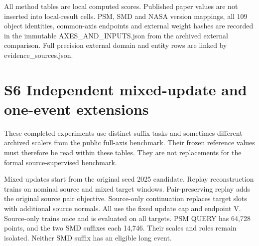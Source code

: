 \documentclass[
  english,
  9pt,
]{article}
\begin{document}
All method tables are local computed scores. Published paper values are
not inserted into local-result cells. PSM, SMD and NASA version
mappings, all 109 object identities, common-axis endpoints and external
weight hashes are recorded in the immutable AXES\_AND\_INPUTS.json from
the archived external comparison. Full precision external domain and
entity rows are linked by evidence\_sources.json.

\section{S6 Independent mixed-update and one-event
extensions}\label{s6-independent-mixed-update-and-one-event-extensions}

These completed experiments use distinct suffix tasks and sometimes
different archived scalers from the public full-axis benchmark. Their
frozen reference values must therefore be read within these tables. They
are not replacements for the formal source-supervised benchmark.

Mixed updates start from the original seed 2025 candidate. Replay
reconstruction trains on nominal source and mixed target windows.
Pair-preserving replay adds the original source pair objective.
Source-only continuation replaces target slots with additional source
normals. All use the fixed update cap and endpoint V. Source-only trains
once and is evaluated on all targets. PSM QUERY has 64,728 points, and
the two SMD suffixes each 14,746. Their scales and roles remain
isolated. Neither SMD suffix has an eligible long event.
\end{document}
